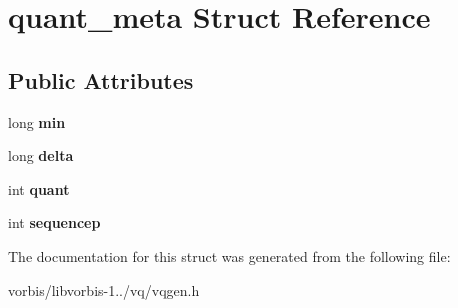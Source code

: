 \hypertarget{structquant__meta}{\section{quant\+\_\+meta Struct Reference}
\label{structquant__meta}
}
\subsection*{Public Attributes}
\begin{DoxyCompactItemize}
\item 
\hypertarget{structquant__meta_a5994b11f43c8e9582499578b39db0ff4}{long {\bfseries min}}\label{structquant__meta_a5994b11f43c8e9582499578b39db0ff4}

\item 
\hypertarget{structquant__meta_adb028305209592c4135b07a1769ab8dc}{long {\bfseries delta}}\label{structquant__meta_adb028305209592c4135b07a1769ab8dc}

\item 
\hypertarget{structquant__meta_ac6db75436255c267e1db09b1f24fc634}{int {\bfseries quant}}\label{structquant__meta_ac6db75436255c267e1db09b1f24fc634}

\item 
\hypertarget{structquant__meta_a6dc0b2157fe56a9436af5818ca221de9}{int {\bfseries sequencep}}\label{structquant__meta_a6dc0b2157fe56a9436af5818ca221de9}

\end{DoxyCompactItemize}


The documentation for this struct was generated from the following file\+:\begin{DoxyCompactItemize}
\item 
vorbis/libvorbis-\/1../vq/vqgen.\+h\end{DoxyCompactItemize}
